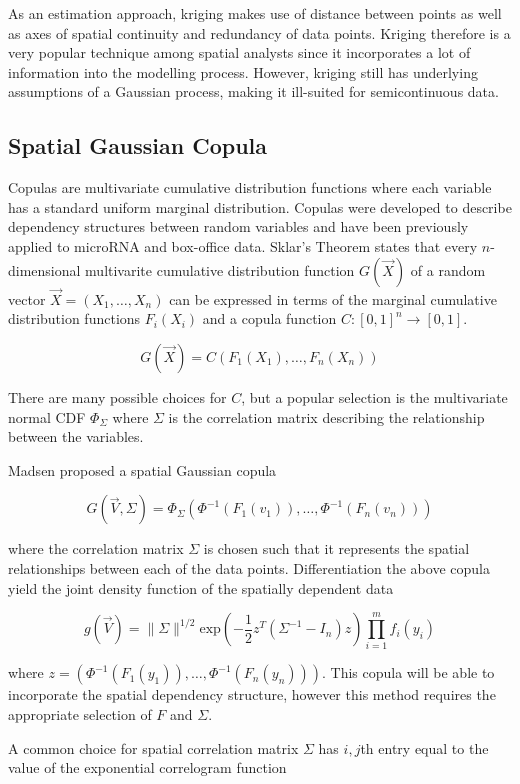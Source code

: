 \documentclass{article}
\begin{document}
As an estimation approach, kriging makes use of distance between points as well as axes of spatial continuity and redundancy of data points.
Kriging therefore is a very popular technique among spatial analysts since it incorporates a lot of information into the modelling process.
However, kriging still has underlying assumptions of a Gaussian process, making it ill-suited for semicontinuous data.

\subsection{Spatial Gaussian Copula}
Copulas are multivariate cumulative distribution functions where each variable has a standard uniform marginal distribution.
Copulas were developed to describe dependency structures between random variables and have been previously applied to microRNA\cite{gaynanova18} and box-office data\cite{duan17}.
Sklar's Theorem states that every $n$-dimensional multivarite cumulative distribution function $G(\vec{X})$ of a random vector $\vec{X} = (X_1, \ldots ,X_n)$ can be expressed in terms of the marginal cumulative distribution functions $F_i(X_i)$ and a copula function $C: [0,1]^n \rightarrow [0,1]$.

$$
G(\vec{X}) = C(F_1(X_1), \ldots, F_n(X_n))
$$

There are many possible choices for $C$, but a popular selection is the multivariate normal CDF $\Phi_{\Sigma}$ where $\Sigma$ is the correlation matrix describing the relationship between the variables.

Madsen\cite{madsen09} proposed a spatial Gaussian copula

$$
G(\vec{V}, \Sigma) = \Phi_{\Sigma}(\Phi^{-1}(F_1(v_1)), \ldots, \Phi^{-1}(F_n(v_n)))
$$

where the correlation matrix $\Sigma$ is chosen such that it represents the spatial relationships between each of the data points.
Differentiation the above copula yield the joint density function of the spatially dependent data

$$
g(\vec{V}) = \| \Sigma \|^{1/2} \text{exp}\left(-\frac{1}{2} z^T (\Sigma^{-1} - I_n) z\right) \prod_{i = 1}^m f_i(y_i)
$$

where $z = (\Phi^{-1}(F_1(y_1)), \ldots, \Phi^{-1}(F_n(y_n)))$.
This copula will be able to incorporate the spatial dependency structure, however this method requires the appropriate selection of $F$ and $\Sigma$.

A common choice for spatial correlation matrix $\Sigma$ has $i,j$th entry equal to the value of the exponential correlogram function
\end{document}

